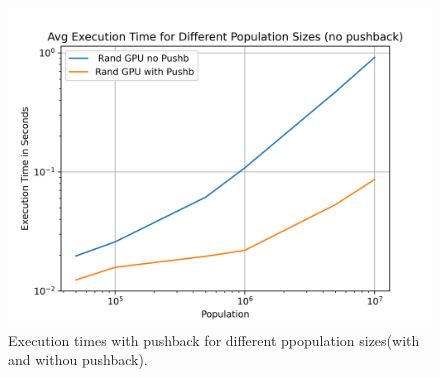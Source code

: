 \documentclass[12pt,a4paper]{article}
\begin{document}
\begin{figure}[H]
    \centering
    \includegraphics[width=12cm]{../Population_no_push.png}
    \caption{Execution times with pushback for different ppopulation sizes(with and withou pushback).}
    \label{fig:population_no_push}
\end{figure}
\end{document}
